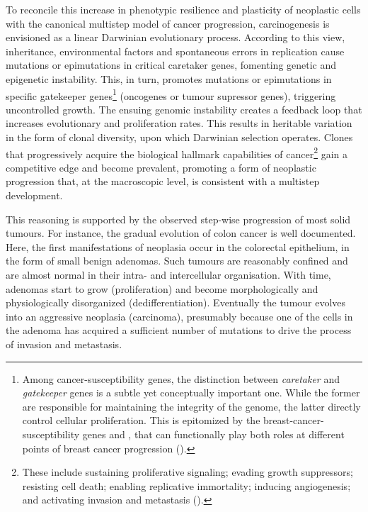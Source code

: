 To reconcile this increase in phenotypic resilience and plasticity of neoplastic
cells with the canonical multistep model of cancer
progression,\cite{land_cellular_1983,vogelstein_multistep_1993} carcinogenesis
is envisioned as a linear Darwinian evolutionary
process.\cite{merlo_cancer_2006,polyak_tumor_2014} According to this
view,\cite{podlaha_evolution_2012} inheritance, environmental factors and
spontaneous errors in  replication cause mutations or
epimutations in critical caretaker genes, fomenting genetic and epigenetic
instability.  This, in turn, promotes mutations or epimutations in specific
gatekeeper genes\footnote{Among \mbox{cancer-susceptibility} genes, the
  distinction between \emph{caretaker} and \emph{gatekeeper} genes is a subtle
  yet conceptually important one.  While the former are responsible for
  maintaining the integrity of the genome, the latter directly control cellular
  proliferation.  This is epitomized by the \mbox{breast-cancer-susceptibility}
  genes  and , that can
  functionally play both roles at different points of breast cancer progression
  (\citealp{kinzler_gatekeepers_1997}).}  (oncogenes or tumour supressor genes),
triggering uncontrolled growth.  The ensuing genomic instability creates a
feedback loop that increases evolutionary and proliferation
rates.\cite{sieber_genomic_2003} This results in heritable variation in the form
of clonal diversity, upon which Darwinian selection operates.  Clones that
progressively acquire the biological hallmark capabilities of
cancer\footnote{These include sustaining proliferative signaling; evading growth
  suppressors; resisting cell death; enabling replicative immortality; inducing
  angiogenesis; and activating invasion and metastasis
  (\citealp{hanahan_hallmarks_2011}).} gain a competitive edge and become
prevalent, promoting a form of neoplastic progression that, at the macroscopic
level, is consistent with a multistep development.


This reasoning is supported by the observed \mbox{step-wise} progression of most
solid tumours.  For instance, the gradual evolution of colon cancer is well
documented.\cite{vogelstein_multistep_1993} Here, the first manifestations of
neoplasia occur in the colorectal epithelium, in the form of small benign
adenomas.  Such tumours are reasonably confined and are almost normal in their
intra- and intercellular organisation.  With time, adenomas start to grow
(proliferation) and become morphologically and physiologically disorganized
(dedifferentiation).  Eventually the tumour evolves into an aggressive neoplasia
(carcinoma), presumably because one of the cells in the adenoma has acquired a
sufficient number of mutations to drive the process of invasion and metastasis.


